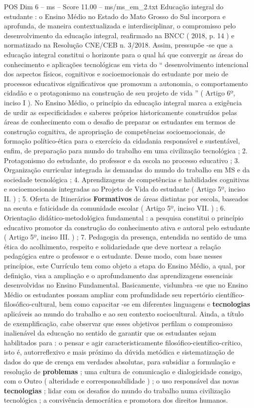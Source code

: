 \begin{textsample}{POS Dim 6 – ms – Score 11.00 – ms/ms\_em\_2.txt}
Educação integral do estudante : o Ensino Médio no Estado do Mato Grosso do Sul incorpora e aprofunda, de maneira contextualizada e interdisciplinar, o compromisso pelo desenvolvimento da educação integral, reafirmado na BNCC ( 2018, p. 14 ) e normatizado na Resolução CNE/CEB n. 3/2018.
Assim, pressupõe -se que a educação integral constitui o horizonte para o qual há que convergir as áreas do conhecimento e aplicações tecnológicas em vista do “ desenvolvimento intencional dos aspectos físicos, cognitivos e socioemocionais do estudante por meio de processos educativos significativos que promovam a autonomia, o comportamento cidadão e o protagonismo na construção de seu projeto de vida ” ( Artigo 6º, inciso I ).
No Ensino Médio, o princípio da educação integral marca a exigência de urdir as especificidades e saberes próprios historicamente construídos pelas áreas de conhecimento com o desafio de preparar os estudantes em termos de construção cognitiva, de apropriação de competências socioemocionais, de formação político-ética para o exercício da cidadania responsável e sustentável, enfim, de preparação para mundo do trabalho em uma civilização tecnológica ; 2.
Protagonismo do estudante, do professor e da escola no processo educativo ; 3.
Organização curricular integrada às demandas do mundo do trabalho em MS e da sociedade tecnológica ; 4.
Aprendizagens de competências e habilidades cognitivas e socioemocionais integradas ao Projeto de Vida do estudante ( Artigo 5º, inciso II. ) ; 5.
Oferta de Itinerários \textbf{Formativos} de áreas distintas por escola, baseados na escuta e faticidade da comunidade escolar ( Artigo 5º, inciso VII. ) ; 6.
Orientação didático-metodológica fundamental : a pesquisa constitui o princípio educativo promotor da construção do conhecimento ativa e autoral pelo estudante ( Artigo 5º, inciso III. ) ; 7.
Pedagogia da presença, entendida no sentido de uma ética do acolhimento, respeito e solidariedade que deve nortear a relação pedagógica entre o professor e o estudante.
Desse modo, com base nesses princípios, este Currículo tem como objeto a etapa do Ensino Médio, a qual, por definição, visa a ampliação e o aprofundamento das aprendizagens essenciais desenvolvidas no Ensino Fundamental.
Basicamente, vislumbra -se que no Ensino Médio os estudantes possam ampliar com profundidade seu repertório científico-filosófico-cultural, bem como capacitar -se em diferentes linguagens e \textbf{tecnologias} aplicáveis ao mundo do trabalho e ao seu contexto sociocultural.
Ainda, a título de exemplificação, cabe observar que esses objetivos perfilam o compromisso inalienável da educação no sentido de garantir que os estudantes sejam habilitados para : o pensar e agir caracteristicamente filosófico-científico-crítico, isto é, autorreflexivo e mais próximo da dúvida metódica e sistematização de dados do que de crença em verdades absolutas, para subsidiar a formulação e resolução de \textbf{problemas} ; uma cultura de comunicação e dialogicidade consigo, com o Outro ( alteridade e corresponsabilidade ) ; o uso responsável das novas \textbf{tecnologias} ; lidar com os desafios do mundo do trabalho numa civilização tecnológica ; a convivência democrática e promotora dos direitos humanos.

\end{textsample}
